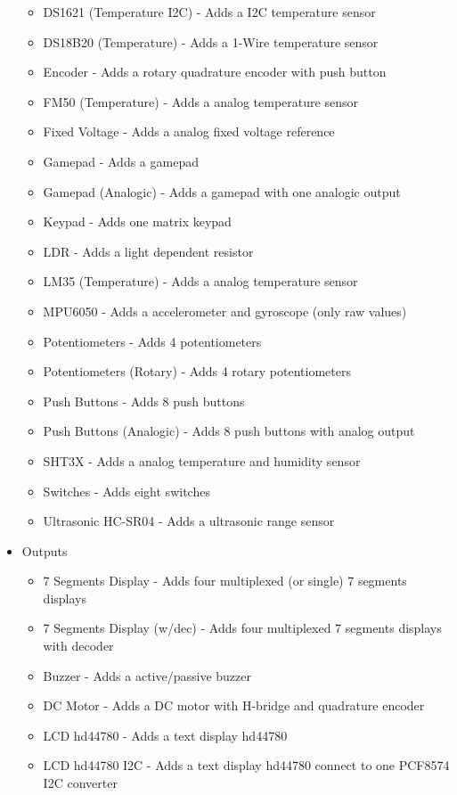 \begin{itemize}
\begin{itemize}
  \item DS1621 (Temperature I2C) -  Adds a I2C temperature sensor 
  \item DS18B20 (Temperature) - Adds a 1-Wire temperature sensor 
  \item Encoder - Adds a rotary quadrature encoder with push button
  \item FM50 (Temperature) - Adds a analog temperature sensor
  \item Fixed Voltage -  Adds a analog fixed voltage reference
  \item Gamepad - Adds a gamepad
  \item Gamepad (Analogic) - Adds a gamepad with one analogic output 
  \item Keypad -  Adds one matrix keypad
  \item LDR - Adds a light dependent resistor 
  \item LM35 (Temperature) - Adds a analog temperature sensor
  \item MPU6050 - Adds a accelerometer and gyroscope (only raw values)
  \item Potentiometers - Adds 4 potentiometers
  \item Potentiometers (Rotary) - Adds 4 rotary potentiometers
  \item Push Buttons - Adds 8 push buttons
  \item Push Buttons (Analogic) - Adds 8 push buttons with analog output
  \item SHT3X - Adds a analog temperature and humidity sensor
  \item Switches - Adds eight switches
  \item Ultrasonic HC-SR04 - Adds a ultrasonic range sensor
\end{itemize}
 \item{Outputs}
  \begin{itemize}
   \item 7 Segments Display -  Adds four multiplexed (or single) 7 segments displays
   \item 7 Segments Display (w/dec) -  Adds four multiplexed 7 segments displays with decoder
   \item Buzzer - Adds a active/passive buzzer
   \item DC Motor - Adds a DC motor with H-bridge and quadrature encoder 
   \item LCD hd44780 - Adds a text display hd44780
   \item LCD hd44780 I2C - Adds a text display hd44780 connect to one PCF8574 I2C converter

\end{itemize}
\end{itemize}
